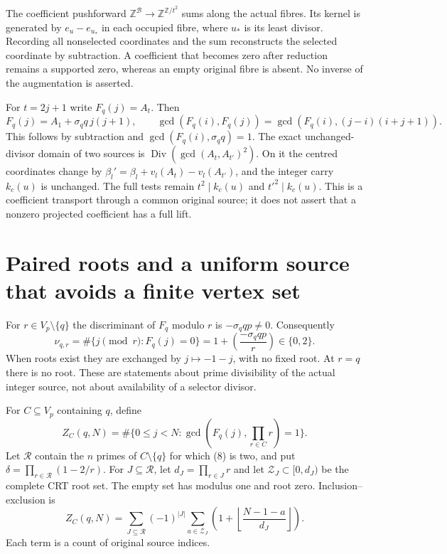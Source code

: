 The coefficient pushforward $\mathbb Z^{\mathcal B}\to\mathbb Z^{\mathbb Z/t^2}$
sums along the actual fibres. Its kernel is generated by $e_u-e_{u_*}$ in each
occupied fibre, where $u_*$ is its least divisor. Recording all nonselected
coordinates and the sum reconstructs the selected coordinate by subtraction.
A coefficient that becomes zero after reduction remains a supported zero, whereas
an empty original fibre is absent. No inverse of the augmentation is asserted.

For $t=2j+1$ write $F_q(j)=A_t$. Then
\[
 F_q(j)=A_1+\sigma_q q\,j(j+1),\qquad
 \boxed{\gcd(F_q(i),F_q(j))=\gcd(F_q(i),(j-i)(i+j+1)).}  \tag{7}
\]
This follows by subtraction and $\gcd(F_q(i),\sigma_q q)=1$.
The exact unchanged-divisor domain of two sources is
$\operatorname{Div}(\gcd(A_t,A_{t'})^2)$.
On it the centred coordinates change by
$\beta_l' =\beta_l+v_l(A_t)-v_l(A_{t'})$, and the integer carry $k_c(u)$ is
unchanged. The full tests remain $t^2\mid k_c(u)$ and $t'^2\mid k_c(u)$.
This is a coefficient transport through a common original source; it does not
assert that a nonzero projected coefficient has a full lift.

\section{Paired roots and a uniform source that avoids a finite vertex set}
For $r\in V_p\setminus\{q\}$ the discriminant of $F_q$ modulo $r$ is
$-\sigma_q q p\ne0$. Consequently
\[
 \nu_{q,r}=\#\{j\pmod r:F_q(j)=0\}
 =1+\left(\frac{-\sigma_q q p}{r}\right)\in\{0,2\}.    \tag{8}
\]
When roots exist they are exchanged by $j\mapsto-1-j$, with no fixed root.
At $r=q$ there is no root. These are statements about prime divisibility of the
actual integer source, not about availability of a selector divisor.

For $C\subseteq V_p$ containing $q$, define
\[
 Z_C(q,N)=\#\{0\le j<N:\gcd(F_q(j),\prod_{r\in C}r)=1\}.
\]
Let $\mathcal R$ contain the $n$ primes of $C\setminus\{q\}$ for which (8) is two,
and put $\delta=\prod_{r\in\mathcal R}(1-2/r)$. For $J\subseteq\mathcal R$,
let $d_J=\prod_{r\in J}r$ and let $\mathcal Z_J\subset[0,d_J)$ be the complete
CRT root set. The empty set has modulus one and root zero. Inclusion--exclusion is
\[
 \boxed{Z_C(q,N)=\sum_{J\subseteq\mathcal R}(-1)^{|J|}
 \sum_{a\in\mathcal Z_J}\left(1+\left\lfloor\frac{N-1-a}{d_J}\right\rfloor\right).} \tag{9}
\]
Each term is a count of original source indices.

